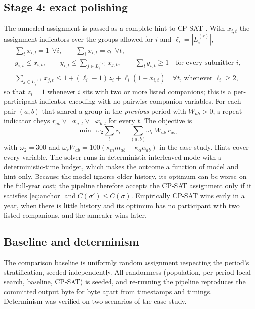 \documentclass[11pt,a4paper]{article}
\theoremstyle{plain}
\theoremstyle{definition}
\theoremstyle{remark}
\begin{document}
\subsection{Stage 4: exact polishing}
The annealed assignment is passed as a complete hint to CP-SAT \citep{ortools}. With $x_{i,t}$ the assignment indicators over the groups allowed for $i$ and $\ell_i = |L^{(r)}_i|$,
\begin{gather*}
\textstyle\sum_t x_{i,t} = 1 \ \ \forall i, \qquad \sum_i x_{i,t} = c_t \ \ \forall t, \\
y_{i,t} \le x_{i,t}, \qquad y_{i,t} \le \textstyle\sum_{j \in L^{(r)}_i} x_{j,t}, \qquad \sum_t y_{i,t} \ge 1 \quad \text{for every submitter } i, \\
\textstyle\sum_{j \in L^{(r)}_i} x_{j,t} \le 1 + (\ell_i - 1)\, z_i + \ell_i (1 - x_{i,t}) \quad \forall t, \ \text{whenever } \ell_i \ge 2,
\end{gather*}
so that $z_i = 1$ whenever $i$ sits with two or more listed companions; this is a per-participant indicator encoding with no pairwise companion variables. For each pair $(a,b)$ that shared a group in the \emph{previous} period with $W_{ab} > 0$, a repeat indicator obeys $r_{ab} \lor \lnot x_{a,t} \lor \lnot x_{b,t}$ for every $t$. The objective is
\[
\min\ \ \omega_2 \sum_i z_i + \sum_{(a,b)} \omega_r\, W_{ab}\, r_{ab},
\]
with $\omega_2 = 300$ and $\omega_r W_{ab} = 100(\kappa_m m_{ab} + \kappa_\alpha \alpha_{ab})$ in the case study. Hints cover every variable. The solver runs in deterministic interleaved mode with a deterministic-time budget, which makes the outcome a function of model and hint only. Because the model ignores older history, its optimum can be worse on the full-year cost; the pipeline therefore accepts the CP-SAT assignment only if it satisfies \eqref{eq:anchor} and $C(\sigma') \le C(\sigma)$. Empirically CP-SAT wins early in a year, when there is little history and its optimum has no participant with two listed companions, and the annealer wins later.

\subsection{Baseline and determinism}
The comparison baseline is uniformly random assignment respecting the period's stratification, seeded independently. All randomness (population, per-period local search, baseline, CP-SAT) is seeded, and re-running the pipeline reproduces the committed output byte for byte apart from timestamps and timings. Determinism was verified on two scenarios of the case study.
\end{document}
